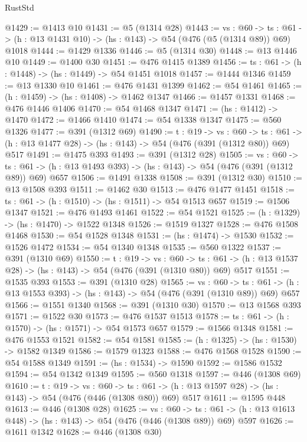 \begin{lexlean}{RustStd}
\begin{coremodule}
@1429 := @1413 @10
@1431 := @5 (@1314 @28)
@1443 := {vs : @60} ->
  {ts : @61} -> (h : @13 @1431 @10) -> (hs : @143) -> @54 (@476 (@5 (@1314 @89)) @69) @1018
@1444 := @1429 @1336
@1446 := @5 (@1314 @30)
@1448 := @13 @1446 @10
@1449 := @1400 @30
@1451 := @476 @1415 @1389
@1456 := {ts : @61} -> (h : @1448) -> (hs : @1449) -> @54 @1451 @1018
@1457 := @1444 @1346
@1459 := @13 @1330 @10
@1461 := @476 @1431 @1399
@1462 := @54 @1461
@1465 := (h : @1459) -> (hs : @1408) -> @1462 @1347
@1466 := @1457 @1331
@1468 := @476 @1446 @1406
@1470 := @54 @1468 @1347
@1471 := (hs : @1412) -> @1470
@1472 := @1466 @1410
@1474 := @54 @1338 @1347
@1475 := @560 @1326
@1477 := @391 (@1312 @69)
@1490 := {t : @19} ->
  {vs : @60} ->
  {ts : @61} -> (h : @13 @1477 @28) -> (hs : @143) -> @54 (@476 (@391 (@1312 @80)) @69) @517
@1491 := @1475 @393
@1493 := @391 (@1312 @28)
@1505 := {vs : @60} ->
  {ts : @61} -> (h : @13 @1493 @393) -> (hs : @143) -> @54 (@476 (@391 (@1312 @89)) @69) @657
@1506 := @1491 @1338
@1508 := @391 (@1312 @30)
@1510 := @13 @1508 @393
@1511 := @1462 @30
@1513 := @476 @1477 @1451
@1518 := {ts : @61} -> (h : @1510) -> (hs : @1511) -> @54 @1513 @657
@1519 := @1506 @1347
@1521 := @476 @1493 @1461
@1522 := @54 @1521
@1525 := (h : @1329) -> (hs : @1470) -> @1522 @1348
@1526 := @1519 @1327
@1528 := @476 @1508 @1468
@1530 := @54 @1528 @1348
@1531 := (hs : @1474) -> @1530
@1532 := @1526 @1472
@1534 := @54 @1340 @1348
@1535 := @560 @1322
@1537 := @391 (@1310 @69)
@1550 := {t : @19} ->
  {vs : @60} ->
  {ts : @61} -> (h : @13 @1537 @28) -> (hs : @143) -> @54 (@476 (@391 (@1310 @80)) @69) @517
@1551 := @1535 @393
@1553 := @391 (@1310 @28)
@1565 := {vs : @60} ->
  {ts : @61} -> (h : @13 @1553 @393) -> (hs : @143) -> @54 (@476 (@391 (@1310 @89)) @69) @657
@1566 := @1551 @1340
@1568 := @391 (@1310 @30)
@1570 := @13 @1568 @393
@1571 := @1522 @30
@1573 := @476 @1537 @1513
@1578 := {ts : @61} -> (h : @1570) -> (hs : @1571) -> @54 @1573 @657
@1579 := @1566 @1348
@1581 := @476 @1553 @1521
@1582 := @54 @1581
@1585 := (h : @1325) -> (hs : @1530) -> @1582 @1349
@1586 := @1579 @1323
@1588 := @476 @1568 @1528
@1590 := @54 @1588 @1349
@1591 := (hs : @1534) -> @1590
@1592 := @1586 @1532
@1594 := @54 @1342 @1349
@1595 := @560 @1318
@1597 := @446 (@1308 @69)
@1610 := {t : @19} ->
  {vs : @60} ->
  {ts : @61} -> (h : @13 @1597 @28) -> (hs : @143) -> @54 (@476 (@446 (@1308 @80)) @69) @517
@1611 := @1595 @448
@1613 := @446 (@1308 @28)
@1625 := {vs : @60} ->
  {ts : @61} -> (h : @13 @1613 @448) -> (hs : @143) -> @54 (@476 (@446 (@1308 @89)) @69) @597
@1626 := @1611 @1342
@1628 := @446 (@1308 @30)

\end{coremodule}
\end{lexlean}
